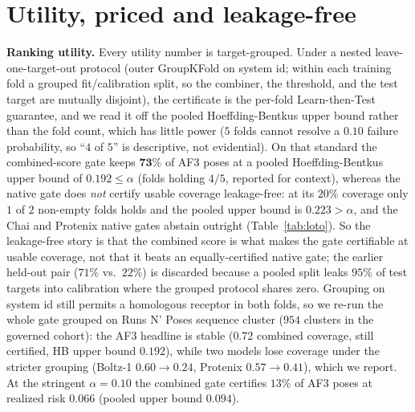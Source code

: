 \documentclass[10pt]{article}
\begin{document}
\section{Utility, priced and leakage-free}\label{sec:utility}
\textbf{Ranking utility.} Every utility number is target-grouped. Under a nested leave-one-target-out
protocol (outer GroupKFold on system id; within each training fold a grouped fit/calibration split, so the
combiner, the threshold, and the test target are mutually disjoint), the certificate is the per-fold
Learn-then-Test guarantee, and we read it off the pooled Hoeffding-Bentkus upper bound rather than the fold
count, which has little power ($5$ folds cannot resolve a $0.10$ failure probability, so ``$4$ of $5$'' is
descriptive, not evidential). On that standard the combined-score gate keeps $\mathbf{73\%}$ of AF3 poses at
a pooled Hoeffding-Bentkus upper bound of $0.192\le\alpha$ (folds holding $4/5$, reported for context),
whereas the native gate does \emph{not} certify usable coverage leakage-free: at its $20\%$ coverage only
$1$ of $2$ non-empty folds holds and the pooled upper bound is $0.223>\alpha$, and the Chai and Protenix
native gates abstain outright (Table~\ref{tab:loto}). So the leakage-free story is that the combined
score is what makes the gate certifiable at usable coverage, not that it beats an equally-certified native
gate; the earlier held-out pair ($71\%$ vs.\ $22\%$) is discarded because a pooled split leaks $95\%$ of
test targets into calibration where the grouped protocol shares zero. Grouping on system id still permits a
homologous receptor in both folds, so we re-run the whole gate grouped on Runs N' Poses sequence cluster
($954$ clusters in the governed cohort): the AF3 headline is stable ($0.72$ combined coverage, still certified, HB upper bound
$0.192$), while two models lose coverage under the stricter grouping (Boltz-1 $0.60\!\to\!0.24$, Protenix
$0.57\!\to\!0.41$), which we report. At the stringent $\alpha=0.10$ the combined gate
certifies $13\%$ of AF3 poses at realized risk $0.066$ (pooled upper bound $0.094$).
\end{document}
